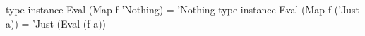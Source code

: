 \begin{code}
type instance Eval (Map f 'Nothing)  = 'Nothing
type instance Eval (Map f ('Just a)) = 'Just (Eval (f a))
\end{code}
